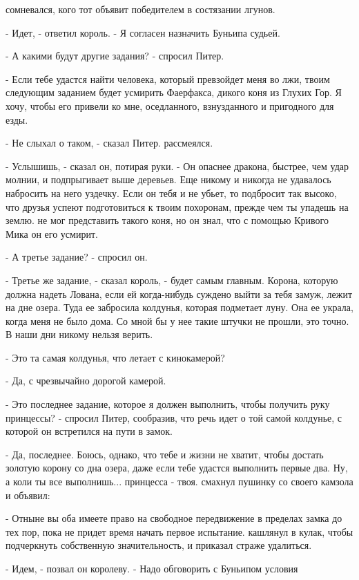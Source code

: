 сомневался, кого тот объявит победителем в состязании лгунов.
\par- Идет, - ответил король. - Я согласен назначить Буньипа судьей.
\par- А какими будут другие задания? - спросил Питер.
\par- Если тебе удастся найти человека, который превзойдет меня во 
лжи, твоим следующим заданием будет усмирить Фаерфакса, дикого коня из 
Глухих Гор. Я хочу, чтобы его привели ко мне, оседланного, 
взнузданного и пригодного для езды.
\par- Не слыхал о таком, - сказал Питер.
 рассмеялся.
\par- Услышишь, - сказал он, потирая руки. - Он опаснее дракона, 
быстрее, чем удар молнии, и подпрыгивает выше деревьев. Еще никому и 
никогда не удавалось набросить на него уздечку. Если он тебя и не 
убьет, то подбросит так высоко, что друзья успеют подготовиться к 
твоим похоронам, прежде чем ты упадешь на землю.
 не мог представить такого коня, но он знал, что с помощью 
Кривого Мика он его усмирит.
\par- А третье задание? - спросил он.
\par- Третье же задание, - сказал король, - будет самым главным. 
Корона, которую должна надеть Лована, если ей когда-нибудь суждено 
выйти за тебя замуж, лежит на дне озера. Туда ее забросила колдунья, 
которая подметает луну. Она ее украла, когда меня не было дома. Со 
мной бы у нее такие штучки не прошли, это точно. В наши дни никому 
нельзя верить.
\par- Это та самая колдунья, что летает с кинокамерой?
\par- Да, с чрезвычайно дорогой камерой.
\par- Это последнее задание, которое я должен выполнить, чтобы 
получить руку принцессы? - спросил Питер, сообразив, что речь идет о 
той самой колдунье, с которой он встретился на пути в замок.
\par- Да, последнее. Боюсь, однако, что тебе и жизни не хватит, чтобы 
достать золотую корону со дна озера, даже если тебе удастся выполнить 
первые два. Ну, а коли ты все выполнишь... принцесса - твоя.
 смахнул пушинку со своего камзола и объявил:
\par- Отныне вы оба имеете право на свободное передвижение в пределах 
замка до тех пор, пока не придет время начать первое испытание.
 кашлянул в кулак, чтобы подчеркнуть собственную значительность, 
и приказал страже удалиться.
\par- Идем, - позвал он королеву. - Надо обговорить с Буньипом условия 
